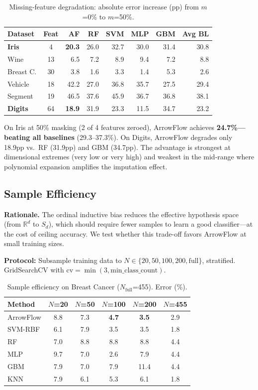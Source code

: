 \documentclass[12pt]{article}
\newcommand{\R}{\mathbb{R}}
\begin{document}
\begin{table}[ht]
\centering
\caption{Missing-feature degradation: absolute error increase (pp) from $m$=0\% to $m$=50\%.}
\label{tab:miss-degrad}
\small
\begin{tabular}{lcrrrrrr}
\toprule
Dataset & Feat & AF & RF & SVM & MLP & GBM & Avg BL \\
\midrule
\textbf{Iris} & 4 & \textbf{20.3} & 26.0 & 32.7 & 30.0 & 31.4 & 30.8 \\
Wine & 13 & 6.5 & 7.2 & 8.9 & 9.4 & 7.2 & 8.8 \\
Breast C. & 30 & 3.8 & 1.6 & 3.3 & 1.4 & 5.3 & 2.6 \\
Vehicle & 18 & 42.2 & 27.0 & 36.8 & 35.7 & 27.5 & 29.4 \\
Segment & 19 & 46.5 & 37.6 & 45.9 & 36.7 & 36.8 & 38.1 \\
\textbf{Digits} & 64 & \textbf{18.9} & 31.9 & 23.3 & 11.5 & 34.7 & 23.2 \\
\bottomrule
\end{tabular}
\end{table}

On Iris at 50\% masking (2 of 4 features zeroed), ArrowFlow achieves \textbf{24.7\%---beating all baselines} (29.3--37.3\%). On Digits, ArrowFlow degrades only 18.9pp vs.\ RF (31.9pp) and GBM (34.7pp). The advantage is strongest at dimensional extremes (very low or very high) and weakest in the mid-range where polynomial expansion amplifies the imputation effect.

\subsection{Sample Efficiency}
\label{sec:sample-eff}

\textbf{Rationale.} The ordinal inductive bias reduces the effective hypothesis space (from $\R^d$ to $S_d$), which should require fewer samples to learn a good classifier---at the cost of ceiling accuracy. We test whether this trade-off favors ArrowFlow at small training sizes.

\textbf{Protocol:} Subsample training data to $N \in \{20, 50, 100, 200, \mathrm{full}\}$, stratified. GridSearchCV with $\mathrm{cv} = \min(3, \text{min\_class\_count})$.

\begin{table}[ht]
\centering
\caption{Sample efficiency on Breast Cancer ($N_{\mathrm{full}}$=455). Error (\%).}
\label{tab:sample-bc}
\begin{tabular}{lccccc}
\toprule
Method & $N$=20 & $N$=50 & $N$=100 & $N$=200 & $N$=455 \\
\midrule
ArrowFlow & 8.8  & 7.3  & \textbf{4.7} & \textbf{3.5} & 2.9 \\
SVM-RBF   & 6.1  & 7.9  & 3.5  & 3.5  & 1.8 \\
RF        & 7.0  & 8.8  & 8.8  & 8.8  & 4.4 \\
MLP       & 9.7  & 7.0  & 2.6  & 7.9  & 4.4 \\
GBM   & 7.9  & 7.0  & 7.9  & 11.4 & 4.4 \\
KNN       & 7.9  & 6.1  & 5.3  & 6.1  & 1.8 \\
\bottomrule
\end{tabular}
\end{table}
\end{document}
